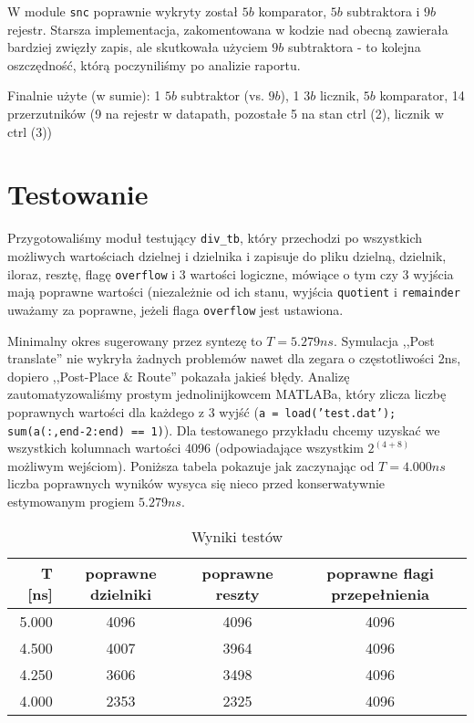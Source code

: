 \documentclass[a4paper]{article}
\begin{document}
W module \texttt{snc} poprawnie wykryty został $5b$ komparator, $5b$ subtraktora i $9b$ rejestr.
Starsza implementacja, zakomentowana w kodzie nad obecną zawierała bardziej zwięzły zapis, ale skutkowała użyciem $9b$ subtraktora - to kolejna oszczędność, którą poczyniliśmy po analizie raportu.

Finalnie użyte (w sumie): 1 $5b$ subtraktor (vs. $9b$), 1 $3b$ licznik, $5b$ komparator, 14 przerzutników (9 na rejestr w datapath, pozostałe 5 na stan ctrl (2), licznik w ctrl (3))
\section{Testowanie}
Przygotowaliśmy moduł testujący \texttt{div\_tb}, który przechodzi po wszystkich możliwych wartościach dzielnej i dzielnika i zapisuje do pliku dzielną, dzielnik, iloraz, resztę, flagę \texttt{overflow} i 3 wartości logiczne, mówiące o tym czy 3 wyjścia mają poprawne wartości (niezależnie od ich stanu, wyjścia \texttt{quotient} i \texttt{remainder} uważamy za poprawne, jeżeli flaga \texttt{overflow} jest ustawiona.

Minimalny okres sugerowany przez syntezę to $T = 5.279ns$.
Symulacja ,,Post translate'' nie wykryła żadnych problemów nawet dla zegara o częstotliwości 2ns, dopiero ,,Post-Place \& Route'' pokazała jakieś błędy.
Analizę zautomatyzowaliśmy prostym jednolinijkowcem MATLABa, który zlicza liczbę poprawnych wartości dla każdego z 3 wyjść (\texttt{a = load('test.dat'); sum(a(:,end-2:end) == 1)}).
Dla testowanego przykładu chcemy uzyskać we wszystkich kolumnach wartości 4096 (odpowiadające wszystkim $2^(4+8)$ możliwym wejściom).
Poniższa tabela pokazuje jak zaczynając od $T = 4.000ns$ liczba poprawnych wyników wysyca się nieco przed konserwatywnie estymowanym progiem $5.279ns$.
\begin{table}[!h]
	\begin{tabular}{r|c c c}
		T [ns]  & poprawne dzielniki & poprawne reszty & poprawne flagi przepełnienia \\
		\hline
		5.000 & 4096 & 4096 & 4096 \\
		4.500 & 4007 & 3964 & 4096 \\
		4.250 & 3606 & 3498 & 4096 \\
		4.000 & 2353 & 2325 & 4096 \\
	\end{tabular}
	\caption{Wyniki testów}
\end{table}
\end{document}
